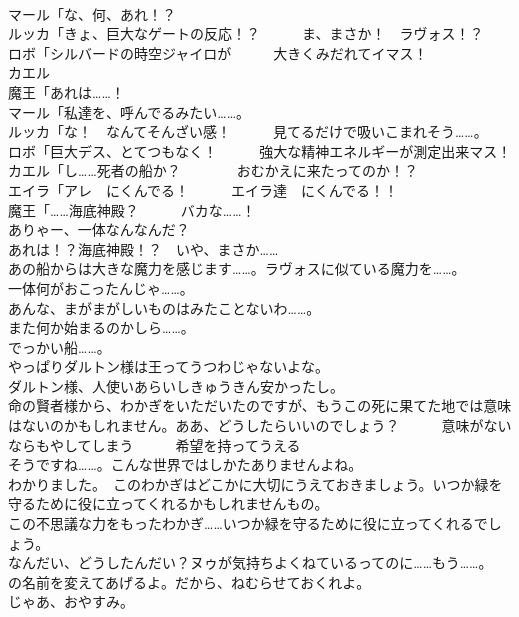 \documentclass[8pt]{extreport}
\begin{document}
\begin{CJK}{UTF8}{min}
\\	マール「な、何、あれ！？	
\\	ルッカ「きょ、巨大なゲートの反応！？　　　ま、まさか！　ラヴォス！？	
\\	ロボ「シルバードの時空ジャイロが　　　大きくみだれてイマス！	
\\	カエル
\\	魔王「あれは……！	
\\	マール「私達を、呼んでるみたい……。	
\\	ルッカ「な！　なんてそんざい感！　　　見てるだけで吸いこまれそう……。	
\\	ロボ「巨大デス、とてつもなく！　　　強大な精神エネルギーが測定出来マス！	
\\	カエル「し……死者の船か？　　　　おむかえに来たってのか！？	
\\	エイラ「アレ　にくんでる！　　　エイラ達　にくんでる！！	
\\	魔王「……海底神殿？　　　バカな……！	
\\	ありゃー、一体なんなんだ？	
\\	あれは！？海底神殿！？　いや、まさか……	
\\	あの船からは大きな魔力を感じます……。ラヴォスに似ている魔力を……。	
\\	一体何がおこったんじゃ……。	
\\	あんな、まがまがしいものはみたことないわ……。	
\\	また何か始まるのかしら……。	
\\	でっかい船……。	
\\	やっぱりダルトン様は王ってうつわじゃないよな。	
\\	ダルトン様、人使いあらいしきゅうきん安かったし。	
\\	命の賢者様から、わかぎをいただいたのですが、もうこの死に果てた地では意味はないのかもしれません。ああ、どうしたらいいのでしょう？　　　意味がないならもやしてしまう　　　希望を持ってうえる	
\\	そうですね……。こんな世界ではしかたありませんよね。	
\\	わかりました。　このわかぎはどこかに大切にうえておきましょう。いつか緑を守るために役に立ってくれるかもしれませんもの。	
\\	この不思議な力をもったわかぎ……いつか緑を守るために役に立ってくれるでしょう。	
\\	なんだい、どうしたんだい？ヌゥが気持ちよくねているってのに……もう……。
\\	の名前を変えてあげるよ。だから、ねむらせておくれよ。	
\\	じゃあ、おやすみ。	

\end{CJK}
\end{document}
